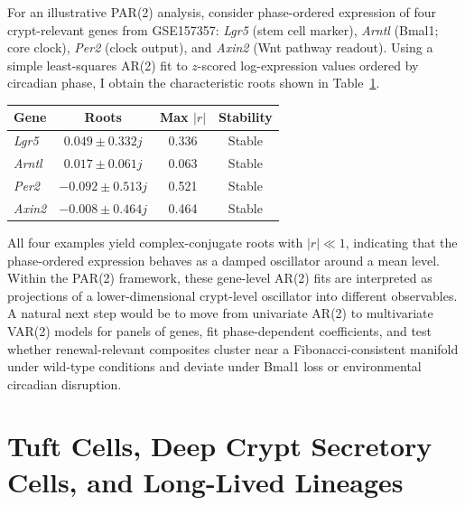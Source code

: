 \documentclass[]{interact}
\begin{document}
For an illustrative PAR(2) analysis, consider phase-ordered expression of four
crypt-relevant genes from GSE157357: \textit{Lgr5} (stem cell marker),
\textit{Arntl} (Bmal1; core clock), \textit{Per2} (clock output), and
\textit{Axin2} (Wnt pathway readout).
Using a simple least-squares AR(2) fit to $z$-scored log-expression values
ordered by circadian phase, I obtain the characteristic roots shown in
Table~\ref{tab:ar2}.

\begin{table}[h]
{\begin{tabular}{lccc}
\toprule
\textbf{Gene} & \textbf{Roots} & \textbf{Max $|r|$} & \textbf{Stability} \\
\midrule
\textit{Lgr5}  & $0.049 \pm 0.332j$ & 0.336 & Stable \\
\textit{Arntl} & $0.017 \pm 0.061j$ & 0.063 & Stable \\
\textit{Per2}  & $-0.092 \pm 0.513j$ & 0.521 & Stable \\
\textit{Axin2} & $-0.008 \pm 0.464j$ & 0.464 & Stable \\
\bottomrule
\end{tabular}}
\label{tab:ar2}
\end{table}

All four examples yield complex-conjugate roots with $|r| \ll 1$, indicating
that the phase-ordered expression behaves as a damped oscillator around a mean
level.
Within the PAR(2) framework, these gene-level AR(2) fits are interpreted as
projections of a lower-dimensional crypt-level oscillator into different
observables.
A natural next step would be to move from univariate AR(2) to multivariate
VAR(2) models for panels of genes, fit phase-dependent coefficients, and test
whether renewal-relevant composites cluster near a Fibonacci-consistent manifold
under wild-type conditions and deviate under Bmal1 loss or environmental
circadian disruption.

\section{Tuft Cells, Deep Crypt Secretory Cells, and Long-Lived Lineages}
\end{document}
